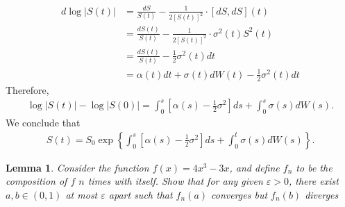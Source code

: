 \documentclass[12pt,reqno]{amsart}
\numberwithin{equation}{section}  %
\newcommand{\ee}{\varepsilon}
\newtheorem{lemma}[theorem]{Lemma}
\begin{document}
\begin{equation*}
\begin{split}
d \log | S(t) |
& = \frac{dS}{S(t)} -\frac{1}{2[S(t)]^{2}} \cdot [dS, dS](t)
\\
& = \frac{dS(t)}{S(t)}  -\frac{1}{2[S(t)]^{2}} \cdot \sigma^{2}(t) S^{2}(t)
\\
& = \frac{dS(t)}{S(t)} - \frac{1}{2} \sigma^{2}(t) dt
\\
& = \alpha(t) dt + \sigma(t) d W(t) - \frac{1}{2} \sigma^{2}(t) dt
\end{split}
\end{equation*}
Therefore,
\begin{equation*}
\begin{split}
  \log | S(t) | - \log | S(0) | = \int_{0}^{s} [\alpha(s) - \frac{1}{2}\sigma^{2}] ds + \int_{0}^{s} \sigma(s) dW(s).
\end{split}
\end{equation*}
We conclude that
\begin{equation*}
\begin{split}
S(t) = S_{0} \exp \left \{\int_{0}^{s} [\alpha(s) - \frac{1}{2}\sigma^{2}] ds + \int_{0}^{t} \sigma(s) dW(s) \right \}.
\end{split}
\end{equation*}
\begin{lemma}
Consider the function $f(x) = 4x^3 - 3x$, and define $f_n$ to be
the composition of $f$ $n$ times with itself. Show that
for any given $\ee > 0$, there exist $a,b \in (0,1)$ at most $\ee$ apart
such that $f_n(a)$ converges but $f_n(b)$ diverges
\end{lemma}
\end{document}
